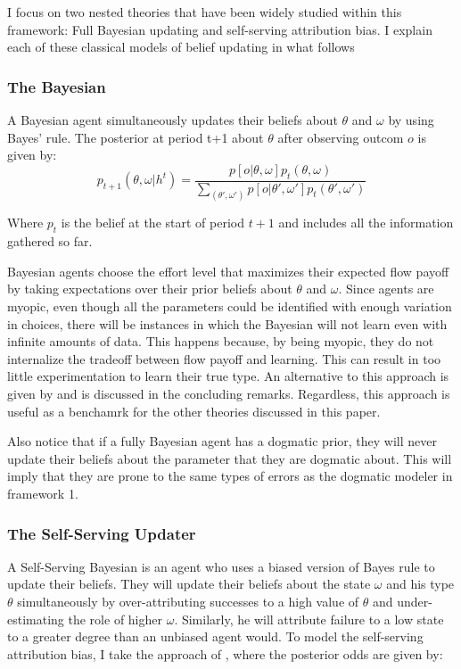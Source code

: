 \documentclass[
  12pt,
]{article}
\begin{document}
I focus on two nested theories that have been widely studied within this
framework: Full Bayesian updating and self-serving attribution bias. I
explain each of these classical models of belief updating in what
follows

\hypertarget{the-bayesian}{%
\subsubsection{The Bayesian}\label{the-bayesian}}

A Bayesian agent simultaneously updates their beliefs about \(\theta\)
and \(\omega\) by using Bayes' rule. The posterior at period t+1 about
\(\theta\) after observing outcom \(o\) is given by: \[
p_{t+1}(\theta, \omega| h^t) = \frac{p[o|\theta, \omega]p_t(\theta, \omega)}{\sum_{(\theta', \omega')}p[o|\theta', \omega']p_t(\theta', \omega')}
\]

Where \(p_{t}\) is the belief at the start of period \(t+1\) and
includes all the information gathered so far.

Bayesian agents choose the effort level that maximizes their expected
flow payoff by taking expectations over their prior beliefs about
\(\theta\) and \(\omega\). Since agents are myopic, even though all the
parameters could be identified with enough variation in choices, there
will be instances in which the Bayesian will not learn even with
infinite amounts of data. This happens because, by being myopic, they do
not internalize the tradeoff between flow payoff and learning. This can
result in too little experimentation to learn their true type. An
alternative to this approach is given by \citet{Hestermann2021} and is
discussed in the concluding remarks. Regardless, this approach is useful
as a benchamrk for the other theories discussed in this paper.

Also notice that if a fully Bayesian agent has a dogmatic prior, they
will never update their beliefs about the parameter that they are
dogmatic about. This will imply that they are prone to the same types of
errors as the dogmatic modeler in framework 1.

\hypertarget{the-self-serving-updater}{%
\subsubsection{The Self-Serving
Updater}\label{the-self-serving-updater}}

A Self-Serving Bayesian is an agent who uses a biased version of Bayes
rule to update their beliefs. They will update their beliefs about the
state \(\omega\) and his type \(\theta\) simultaneously by
over-attributing successes to a high value of \(\theta\) and
under-estimating the role of higher \(\omega\). Similarly, he will
attribute failure to a low state to a greater degree than an unbiased
agent would. To model the self-serving attribution bias, I take the
approach of \citet{benjamin2019}, where the posterior odds are given by:
\end{document}
